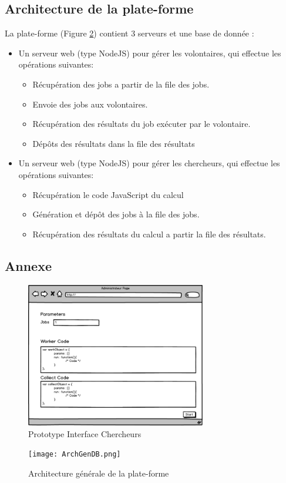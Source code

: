 \documentclass[a4paper]{article}
\begin{document}
\subsection{Architecture de la plate-forme}
La plate-forme (Figure \ref{fig:ArchGenarale}) contient 3 serveurs et une base de donnée :
\begin{itemize}
\item Un serveur web (type NodeJS) pour gérer les volontaires, qui effectue les opérations suivantes:
\begin{itemize}
\item Récupération des jobs a partir de la file des jobs.
\item Envoie des jobs aux volontaires.
\item Récupération des résultats du job exécuter par le volontaire.
\item Dépôts des résultats dans la file des résultats
\end{itemize} 
\item Un serveur web (type NodeJS) pour gérer les chercheurs, qui effectue les opérations suivantes:
\begin{itemize}
\item Récupération le code JavaScript du calcul
\item Génération et dépôt des jobs à la file des jobs.
\item Récupération des résultats du calcul a partir la file des résultats.
\end{itemize} 

\end{itemize}  


\subsection{Annexe}
\begin{figure}
\centering
\includegraphics[width=0.7\textwidth]{calc1.png}
\caption{\label{fig:ProtoChercheur}Prototype Interface Chercheurs}
\end{figure}
\begin{figure}
\centering
\texttt{[image: ArchGenDB.png]}
\caption{\label{fig:ArchGenarale}Architecture générale de la plate-forme}
\end{figure}
\end{document}
